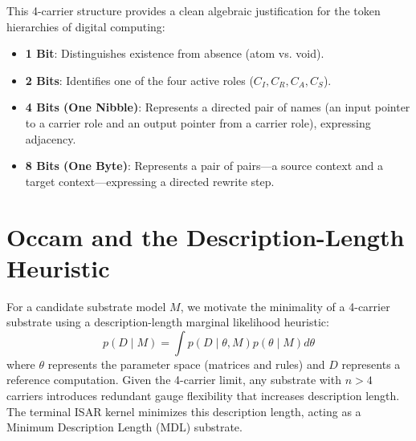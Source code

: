 \begin{remark}
This 4-carrier structure provides a clean algebraic justification for the token hierarchies of digital computing:
\begin{itemize}
    \item \textbf{1 Bit}: Distinguishes existence from absence (atom vs. void).
    \item \textbf{2 Bits}: Identifies one of the four active roles ($C_I, C_R, C_A, C_S$).
    \item \textbf{4 Bits (One Nibble)}: Represents a directed pair of names (an input pointer to a carrier role and an output pointer from a carrier role), expressing adjacency.
    \item \textbf{8 Bits (One Byte)}: Represents a pair of pairs—a source context and a target context—expressing a directed rewrite step.
\end{itemize}
\end{remark}

\section{Occam and the Description-Length Heuristic}

For a candidate substrate model $M$, we motivate the minimality of a 4-carrier substrate using a description-length marginal likelihood heuristic:
$$ p(D \mid M) = \int p(D \mid \theta, M) p(\theta \mid M) d\theta $$
where $\theta$ represents the parameter space (matrices and rules) and $D$ represents a reference computation. Given the 4-carrier limit, any substrate with $n > 4$ carriers introduces redundant gauge flexibility that increases description length. The terminal ISAR kernel minimizes this description length, acting as a Minimum Description Length (MDL) substrate.
